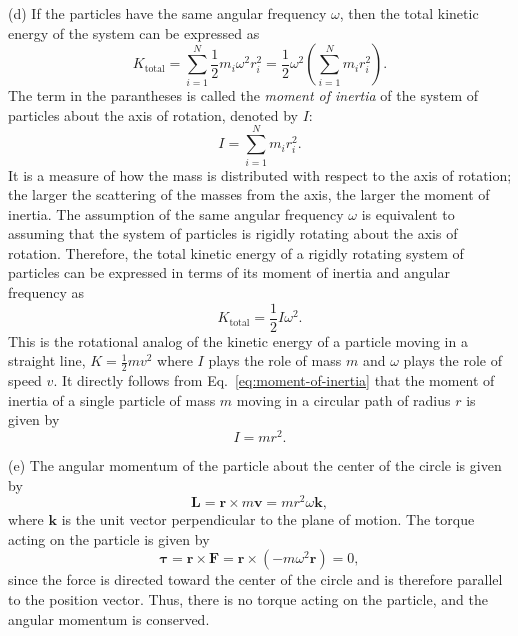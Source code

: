\documentclass[12pt]{article}
\begin{document}
(d) If the particles have the same angular frequency $\omega$, then the total kinetic energy of the system can be expressed as
\begin{equation}
    K_{\text{total}} = \sum_{i=1}^{N} \frac{1}{2} m_i \omega^2 r_i^2 = \frac{1}{2} \omega^2 \left(\sum_{i=1}^{N} m_i r_i^2\right).
\end{equation}
The term in the parantheses is called the \emph{moment of inertia} of the system of particles about the axis of rotation, denoted by $I$:
\begin{equation}
    I = \sum_{i=1}^{N} m_i r_i^2.
    \label{eq:moment-of-inertia}
\end{equation}
It is a measure of how the mass is distributed with respect to the axis of rotation; the larger the scattering of the masses from the axis, the larger the moment of inertia. The assumption of the same angular frequency $\omega$ is equivalent to assuming that the system of particles is rigidly rotating about the axis of rotation. Therefore, the total kinetic energy of a rigidly rotating system of particles can be expressed in terms of its moment of inertia and angular frequency as
\begin{equation}
    K_{\text{total}} = \frac{1}{2} I \omega^2.
\end{equation}
This is the rotational analog of the kinetic energy of a particle moving in a straight line, $K = \frac{1}{2} m v^2$ where $I$ plays the role of mass $m$ and $\omega$ plays the role of speed $v$. It directly follows from Eq.~\ref{eq:moment-of-inertia} that the moment of inertia of a single particle of mass $m$ moving in a circular path of radius $r$ is given by
\begin{equation}
    I = m r^2.
\end{equation}


(e) The angular momentum of the particle about the center of the circle is given by
\begin{equation}
    \mathbf{L} = \mathbf{r} \times m \mathbf{v} = m r^2 \omega \mathbf{k},
\end{equation}
where $\mathbf{k}$ is the unit vector perpendicular to the plane of motion. The torque acting on the particle is given by
\begin{equation}
    \boldsymbol{\tau} = \mathbf{r} \times \mathbf{F} = \mathbf{r} \times (-m \omega^2 \mathbf{r}) = 0,
\end{equation}
since the force is directed toward the center of the circle and is therefore parallel to the position vector. Thus, there is no torque acting on the particle, and the angular momentum is conserved.
\end{document}
